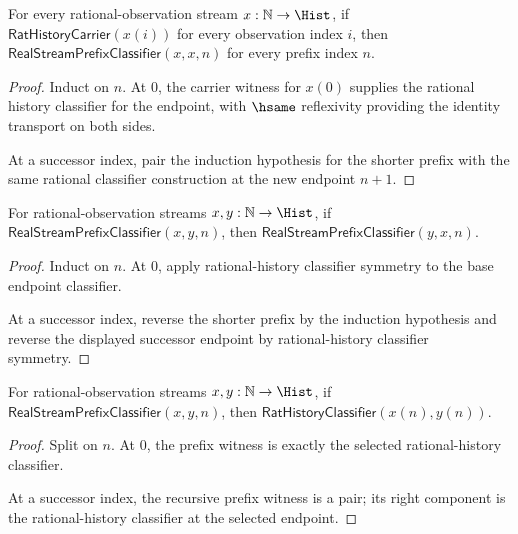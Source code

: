 \begin{theorem}
\label{thm:real-stream-prefix-classifier-refl}
For every rational-observation stream $x:\mathbb{N}\to\Hist$, if
$\mathsf{RatHistoryCarrier}(x(i))$ for every observation index $i$, then
$\mathsf{RealStreamPrefixClassifier}(x,x,n)$ for every prefix index $n$.
\end{theorem}
\begin{proof}
Induct on $n$. At $0$, the carrier witness for $x(0)$ supplies the rational
history classifier for the endpoint, with $\hsame$ reflexivity providing the
identity transport on both sides.

At a successor index, pair the induction hypothesis for the shorter prefix with
the same rational classifier construction at the new endpoint $n+1$.
\end{proof}

\begin{theorem}
\label{thm:real-stream-prefix-classifier-symm}
For rational-observation streams $x,y:\mathbb{N}\to\Hist$, if
$\mathsf{RealStreamPrefixClassifier}(x,y,n)$, then
$\mathsf{RealStreamPrefixClassifier}(y,x,n)$.
\end{theorem}
\begin{proof}
Induct on $n$. At $0$, apply rational-history classifier symmetry to the base
endpoint classifier.

At a successor index, reverse the shorter prefix by the induction hypothesis and
reverse the displayed successor endpoint by rational-history classifier
symmetry.
\end{proof}

\begin{theorem}
\label{thm:real-stream-prefix-classifier-endpoint}
For rational-observation streams $x,y:\mathbb{N}\to\Hist$, if
$\mathsf{RealStreamPrefixClassifier}(x,y,n)$, then
$\mathsf{RatHistoryClassifier}(x(n),y(n))$.
\end{theorem}
\begin{proof}
Split on $n$. At $0$, the prefix witness is exactly the selected rational-history
classifier.

At a successor index, the recursive prefix witness is a pair; its right
component is the rational-history classifier at the selected endpoint.
\end{proof}

